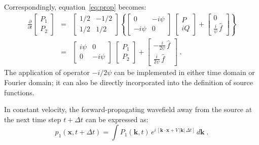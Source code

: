Correspondingly, equation~\ref{eq:prop} becomes:
\begin{eqnarray}
 \label{eq:prop2}
\frac{\partial}{\partial t}\left[ 
\begin{array}{c}
  P_1 \\ 
  P_2 \end{array} \right] 
&=&
\left[
\begin{array}{cc}
 1/2 & -1/2 \\ 
 1/2 &  1/2 \end{array} \right] 
\left\{ \left[ 
\begin{array}{cc}
  0      & -i\psi  \\
  -i\psi  & 0 \end{array} \right] 
\; \left[ 
\begin{array}{c}
  P \\ 
  iQ \end{array} \right]
+
\left[
\begin{array}{c}
0 \\
\frac{i}{\psi}\,\hat{f} \end{array} \right] \right\} \\
&=&
\left[ 
\begin{array}{cc}
  i\psi & 0 \\ 
  0     & -i\psi \end{array} \right] 
\; \left[
\begin{array}{c}
 P_1 \\ 
 P_2 \end{array} \right]
+
\left[
\begin{array}{c}
 -\frac{i}{2\psi}\,\hat{f} \\ 
 \frac{i}{2\psi}\,\hat{f} \end{array} \right] \nonumber \; .
\end{eqnarray}
The application of operator $-i/2\psi$ can be implemented in either time domain or Fourier domain; it can also be directly incorporated into the definition of source functions. 

In constant velocity, the forward-propagating wavefield away from the source at the next time step $t+\Delta t$ can be expressed as:
\begin{equation}
  \label{eq:expconstant}
  p_1(\mathbf{x},t+\Delta t) = \int
  P_1(\mathbf{k},t)\,e^{i\,[\mathbf{k} \cdot \mathbf{x} + V\,|\mathbf{k}|\,\Delta t]}\,d\mathbf{k}\;.
\end{equation}


